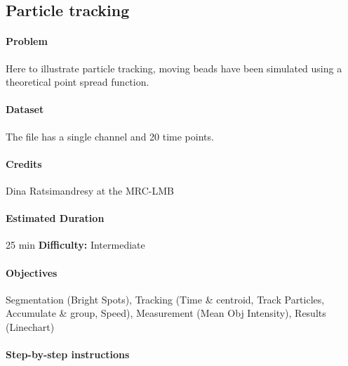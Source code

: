 \subsection{Particle tracking}

\paragraph{Problem}
Here to illustrate particle tracking, moving beads have been simulated using a theoretical point spread function.

\paragraph{Dataset} The file  has a single channel and 20 time points.

\paragraph{Credits} Dina Ratsimandresy at the MRC-LMB

\paragraph{Estimated Duration} 25 min \quad \textbf{Difficulty:} Intermediate

\paragraph{Objectives} Segmentation (Bright Spots), Tracking (Time \& centroid, Track Particles, Accumulate \& group, Speed), Measurement (Mean Obj Intensity), Results (Linechart)


\paragraph{Step-by-step instructions}

